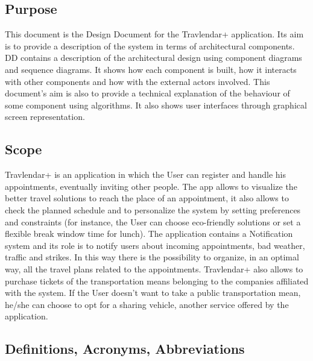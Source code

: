 \subsection{Purpose}
This document is the Design Document for the Travlendar+ application. Its aim is to provide a description of the system in terms of architectural components. DD contains a description of the architectural design using component diagrams and sequence diagrams. It shows how each component is built, how it interacts with other components and how with the external actors involved. This document's aim is also to provide a technical explanation of the behaviour of some component using algorithms. It also shows user interfaces through graphical screen representation.
	
\subsection{Scope}
Travlendar+ is an application in which the User can register and handle his appointments, eventually inviting other people. The app allows to visualize the better travel solutions to reach the place of an appointment, it also allows to check the planned schedule and to personalize the system by setting preferences and constraints (for instance, the User can choose eco-friendly  solutions or set a flexible break window time for lunch). \newline 
The application contains a Notification system and its role is to notify users about incoming appointments, bad weather, traffic and strikes. In this way there is the possibility to organize, in an optimal way, all the travel plans related to the appointments. \newline 
Travlendar+ also allows to purchase tickets of the transportation means belonging to the companies affiliated with the system. If the User doesn't want to take a public transportation mean, he/she can choose to opt for a sharing vehicle, another service offered by the application. 

\subsection{Definitions, Acronyms, Abbreviations}
